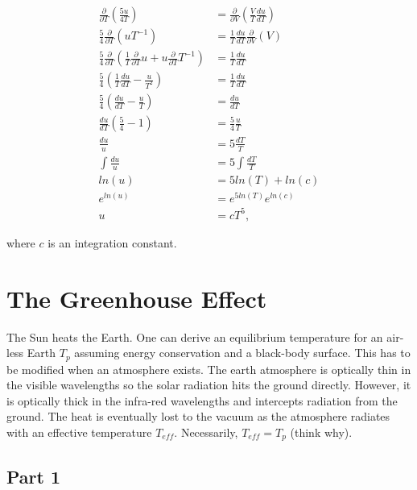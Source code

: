 \documentclass[12pt]{article}
\begin{document}
\begin{equation*}
\begin{split}
\frac{\partial}{\partial T}\left(\frac{5u}{4T}\right) &= \frac{\partial}{\partial V}\left(\frac{V}{T}\frac{du}{dT}\right)\\
\frac{5}{4}\frac{\partial}{\partial T}(uT^{-1}) &= \frac{1}{T}\frac{du}{dT}\frac{\partial}{\partial V}\left(V\right)\\
\frac{5}{4}\frac{\partial}{\partial T}(\frac{1}{T}\frac{\partial}{\partial T}u + u\frac{\partial}{\partial T}T^{-1}) &= \frac{1}{T}\frac{du}{dT}\\
\frac{5}{4}\left(\frac{1}{T}\frac{du}{dT} - \frac{u}{T^2}\right) &= \frac{1}{T}\frac{du}{dT}\\
\frac{5}{4}\left(\frac{du}{dT} - \frac{u}{T}\right) &= \frac{du}{dT} \\
\frac{du}{dT}\left(\frac{5}{4}-1\right) &= \frac{5}{4}\frac{u}{T}\\
\frac{du}{u} &= 5\frac{dT}{T}\\
\int\frac{du}{u} &= 5\int\frac{dT}{T}\\
ln(u) &= 5ln(T) + ln(c)\\
e^{ln(u)} &= e^{5ln(T)}e^{ln(c)}\\
u &= cT^5,
\end{split}
\end{equation*}

where $c$ is an integration constant.


\section{The Greenhouse Effect}

The Sun heats the Earth. One can derive an equilibrium temperature for an air-less Earth $T_p$ assuming energy conservation and a black-body surface. This has to
be modified when an atmosphere exists. The earth atmosphere is optically thin in the visible wavelengths so the solar radiation hits the ground directly. However, it is optically thick in the infra-red wavelengths and intercepts radiation from the ground. The heat is eventually lost to the vacuum as the atmosphere radiates with an effective temperature $T_{eff}$. Necessarily, $T_{eff} = T_p$ (think why).

\subsection*{Part 1}
\end{document}
